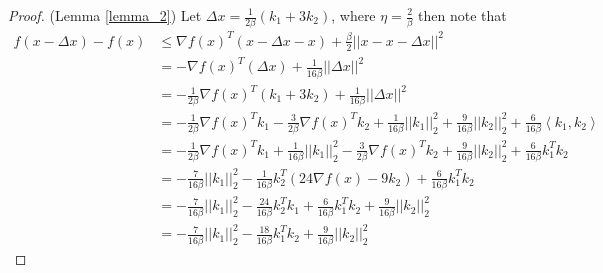 \begin{proof}(Lemma \ref{lemma_2})
Let $\Delta x =  \frac{1}{2\beta}(k_1 + 3k_2)$, where $\eta = \frac{2}{\beta}$ then note that
\begin{equation}
\begin{aligned}\label{ineq0}
f(x - \Delta x) - f(x) &\leq \nabla f(x)^T (x - \Delta x - x) + \frac{\beta}{2} || x - x - \Delta x ||^2 \\
&= -  \nabla f(x)^T ( \Delta x) + \frac{1}{16 \beta} || \Delta x ||^2 \\
&= -\frac{1}{2 \beta} \nabla  f(x)^T ( k_1 + 3k_2) + \frac{1}{16 \beta} || \Delta x ||^2 \\
&= -\frac{1}{2\beta}\nabla f(x)^T k_1 - \frac{3}{2\beta}\nabla f(x)^T k_2 + \frac{1}{16 \beta} || k_1 ||_2^2 + \frac{9}{16 \beta} || k_2 ||^2_2 + \frac{6}{16\beta}\left\langle k_1, k_2 \right\rangle \\
&= -\frac{1}{2\beta}\nabla f(x)^T k_1 +  \frac{1}{16 \beta} || k_1 ||_2^2 -  \frac{3}{2\beta}\nabla f(x)^T k_2 +  \frac{9}{16 \beta} || k_2 ||^2_2  + \frac{6}{16\beta}k_1^{T} k_2 \\
&= -\frac{7}{16 \beta}|| k_1 ||_2^2 -\frac{1}{16 \beta}k_2^T(24 \nabla f(x) - 9 k_2) + \frac{6}{16\beta}k_1^{T} k_2 \\
&= -\frac{7}{16 \beta}|| k_1 ||_2^2 - \frac{24}{16 \beta}k_2^Tk_1 + \frac{6}{16 \beta}k_1^{T} k_2 + \frac{9}{16\beta}|| k_2 ||_2^2 \\
&= -\frac{7}{16 \beta}|| k_1 ||_2^2 - \frac{18}{16 \beta} k_1^{T} k_2 + \frac{9}{16 \beta}|| k_2 ||_2^2
\end{aligned}
\end{equation}


\end{proof}
